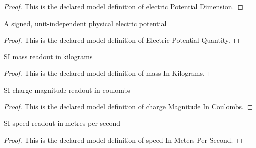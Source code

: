 \begin{proof}
  This is the declared model definition of electric Potential Dimension.
\end{proof}
\begin{definition}
  \label{def:physics:phyx-mini-0866:phyxminiproblems-problemphyxmini0866-electricpotentialquantity}
  A signed, unit-independent physical electric potential
\end{definition}
\begin{proof}
  This is the declared model definition of Electric Potential Quantity.
\end{proof}
\begin{definition}
  \label{def:physics:phyx-mini-0866:phyxminiproblems-problemphyxmini0866-massinkilograms}
  SI mass readout in kilograms
\end{definition}
\begin{proof}
  This is the declared model definition of mass In Kilograms.
\end{proof}
\begin{definition}
  \label{def:physics:phyx-mini-0866:phyxminiproblems-problemphyxmini0866-chargemagnitudeincoulombs}
  SI charge-magnitude readout in coulombs
\end{definition}
\begin{proof}
  This is the declared model definition of charge Magnitude In Coulombs.
\end{proof}
\begin{definition}
  \label{def:physics:phyx-mini-0866:phyxminiproblems-problemphyxmini0866-speedinmeterspersecond}
  SI speed readout in metres per second
\end{definition}
\begin{proof}
  This is the declared model definition of speed In Meters Per Second.
\end{proof}
